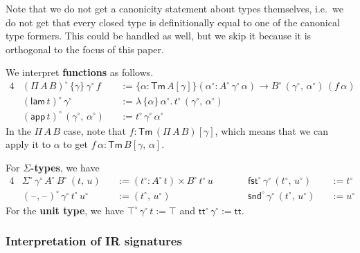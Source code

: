 \documentclass[acmsmall,screen,review,anonymous]{acmart}
\newcommand{\msf}[1]{{\mathsf{#1}}}
\newcommand{\ttt}{\msf{tt}}
\newcommand{\blank}{{\mathord{\hspace{1pt}\text{--}\hspace{1pt}}}}
\newcommand{\fst}{\msf{fst}}
\newcommand{\snd}{\msf{snd}}
\newcommand{\Tm}{\msf{Tm}}
\newcommand{\w}{\circ}
\newcommand{\lam}{\msf{lam}}
\newcommand{\app}{\msf{app}}
\begin{document}
Note that we do not get a canonicity statement about types themselves, i.e.\ we do not get that
every closed type is definitionally equal to one of the canonical type formers. This could be handled
as well, but we skip it because it is orthogonal to the focus of this paper.

We interpret \textbf{functions} as follows.
\begin{alignat*}{4}
  &(\Pi\,A\,B)^\w\,\{\gamma\}\,\gamma^\w\,f &&:= \{\alpha : \Tm\,A[\gamma]\}(\alpha^\w : A^\w\,\gamma^\w\,\alpha) \to B^\w\,(\gamma^\w,\,\alpha^\w)\,(f\,\alpha)\\
  &(\lam\,t)^\w\,\gamma^\w &&:= \lambda\,\{\alpha\}\,\alpha^\w.\,t^\w\,(\gamma^\w,\,\alpha^\w)\\
  &(\app\,t)^\w\,(\gamma^\w,\,\alpha^\w) &&:= t^\w\,\gamma^\w\,\alpha^\w
\end{alignat*}
In the $\Pi\,A\,B$ case, note that $f : \Tm\,(\Pi\,A\,B)[\gamma]$, which means that we can apply it
to $\alpha$ to get $f\,\alpha : \Tm\,B[\gamma,\,\alpha]$.

For \textbf{$\Sigma$-types}, we have
\begin{alignat*}{4}
  &\Sigma^\w\,\gamma^\w\,A^\w\,B^\w\,(t,\,u)   &&:= (t^\w : A^\w\,t) \times B^\w\,t^\w\,u\hspace{2em}  && \fst^\w\,\gamma^\w\,(t^\w,\,u^\w) &&:= t^\w \\
  &(\blank,\blank)^\w\,\gamma^\w\,t^\w\,u^\w   &&:= (t^\w,\,u^\w)                                     && \snd^\w\,\gamma^\w\,(t^\w,\,u^\w) &&:= u^\w
\end{alignat*}
For the \textbf{unit type}, we have $\top^\w\,\gamma^\w\,t := \top$ and $\ttt^\w\,\gamma^\w := \ttt$.

\subsubsection{Interpretation of IR signatures}
\end{document}
